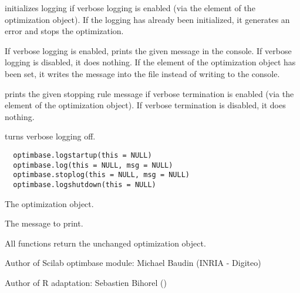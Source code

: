 %
\begin{Description}\relax
{} initializes logging if verbose logging is enabled
(via the  element of the optimization object). If the logging
has already been initialized, it generates an error and stops the
optimization.

If verbose logging is enabled,  prints the given message
in the console. If  verbose logging is disabled, it does nothing. If the
 element of the optimization object has been  set, it writes the
message into the file instead of writing to the console.

 prints the given stopping rule message if verbose
termination is enabled (via the  element of the
optimization object). If verbose termination is disabled, it does nothing.

 turns verbose logging off.
\end{Description}
%
\begin{Usage}
\begin{verbatim}
  optimbase.logstartup(this = NULL)
  optimbase.log(this = NULL, msg = NULL)
  optimbase.stoplog(this = NULL, msg = NULL)
  optimbase.logshutdown(this = NULL)
\end{verbatim}
\end{Usage}
%
\begin{Arguments}
\begin{ldescription}
\item[\code{this}] The optimization object.
\item[\code{msg}] The message to print.
\end{ldescription}
\end{Arguments}
%
\begin{Value}
All functions return the unchanged optimization object.
\end{Value}
%
\begin{Author}\relax
Author of Scilab optimbase module: Michael Baudin (INRIA - Digiteo)

Author of R adaptation: Sebastien Bihorel ()
\end{Author}
